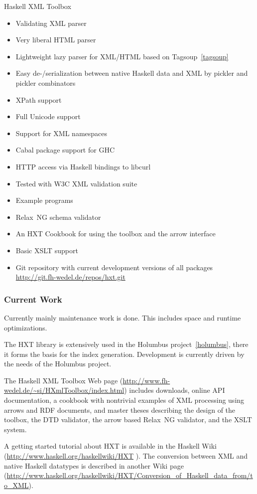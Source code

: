 \begin{hcarentry}[updated]{Haskell XML Toolbox}
\begin{itemize}
\item Validating XML parser
\item Very liberal HTML parser
\item Lightweight lazy parser for XML/HTML based on Tagsoup~\cref{tagsoup}
\item Easy de-/serialization between native Haskell data and XML by pickler and pickler combinators
\item XPath support
\item Full Unicode support
\item Support for XML namespaces
\item Cabal package support for GHC
\item HTTP access via Haskell bindings to libcurl
\item Tested with W3C XML validation suite
\item Example programs
\item Relax~NG schema validator
\item An HXT Cookbook for using the toolbox and the arrow interface
\item Basic XSLT support
\item Git repository with current development versions of all packages
  \url{http://git.fh-wedel.de/repos/hxt.git}
\end{itemize}

\subsubsection*{Current Work}

Currently mainly maintenance work is done. This includes
space and runtime optimizations.

The HXT library is extensively used in the Holumbus
project~\cref{holumbus}, there it forms the basis for the index generation.
Development is currently driven by the needs of the Holumbus project.

\FurtherReading
The Haskell XML Toolbox Web page
(\url{http://www.fh-wedel.de/~si/HXmlToolbox/index.html})
includes downloads, online API documentation, a cookbook with nontrivial examples
of XML processing using arrows and RDF documents, and master theses describing the
design of the toolbox, the DTD validator, the arrow based Relax~NG
validator, and the XSLT system.

A getting started tutorial about HXT is available in the Haskell Wiki (\url{http://www.haskell.org/haskellwiki/HXT}
). The conversion between XML and native Haskell datatypes is
described in another Wiki page
(\url{http://www.haskell.org/haskellwiki/HXT/Conversion_of_Haskell_data_from/to_XML}).
\end{hcarentry}
